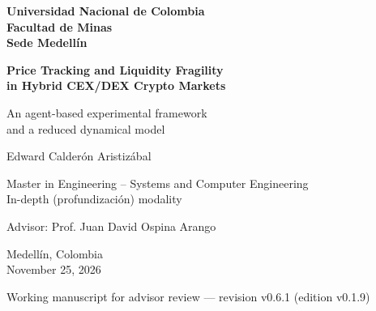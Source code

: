 \documentclass[11pt,letterpaper]{report}
\newcommand{\versionTesis}{v0.1.9}
\newcommand{\revisionManuscrito}{v0.6.1}
\numberwithin{equation}{chapter}
\begin{document}
\begin{titlepage}
  \thispagestyle{empty}
  \centering
  \singlespacing
  {\large\bfseries Universidad Nacional de Colombia\\[2pt]
  Facultad de Minas\\[2pt]
  Sede Medellín\par}
  \vspace{3.2cm}
  {\LARGE\bfseries Price Tracking and Liquidity Fragility\\
  in Hybrid CEX/DEX Crypto Markets\par}
  \vspace{0.9cm}
  {\Large An agent-based experimental framework\\
  and a reduced dynamical model\par}
  \vspace{2.6cm}
  {\Large Edward Calderón Aristizábal\par}
  \vspace{1.6cm}
  {\large Master in Engineering -- Systems and Computer Engineering\\[2pt]
  In-depth (profundización) modality\par}
  \vspace{0.8cm}
  {\large Advisor: Prof. Juan David Ospina Arango\par}
  \vfill
  {\large Medellín, Colombia\\[2pt]
  November 25, 2026\par}
  \vspace{0.3cm}
  {\small Working manuscript for advisor review --- revision \revisionManuscrito{} (edition \versionTesis{})\par}
\end{titlepage}

\setcounter{page}{1}

\begingroup
\setcounter{secnumdepth}{-1}
\titleformat{\section}{\Large\bfseries}{}{0pt}{}
\singlespacing

\clearpage

\endgroup
\setcounter{secnumdepth}{2}
\end{document}
